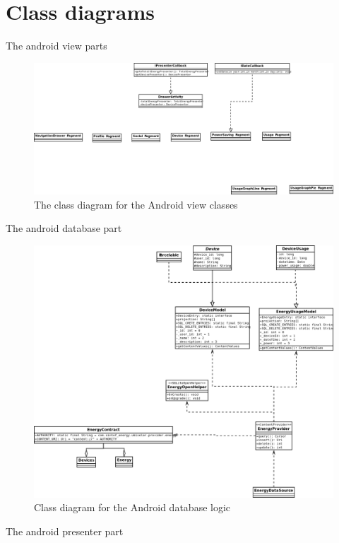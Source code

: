 \section{Class diagrams}

The android view parts
\begin{figure}[H]
\includegraphics[width=\textwidth]{ch/architecture/fig/ClassDiagramAndroid.png}
\caption{The class diagram for the Android view classes}
\end{figure}

The android database part
\begin{figure}[H]
\includegraphics[width=\textwidth]{ch/architecture/fig/classDiagramAndroidDatabase.png}
\caption{Class diagram for the Android database logic}
\end{figure}

The android presenter part
